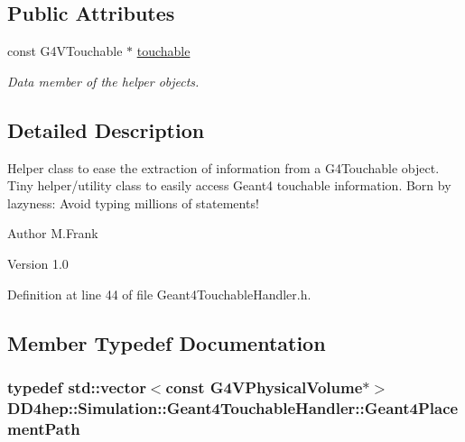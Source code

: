\subsection*{Public Attributes}
\begin{DoxyCompactItemize}
\item 
const G4VTouchable $\ast$ \hyperlink{class_d_d4hep_1_1_simulation_1_1_geant4_touchable_handler_a33a2263e30f96abe93ee3be5a189c3b4}{touchable}
\begin{DoxyCompactList}\small\item\em Data member of the helper objects. \item\end{DoxyCompactList}\end{DoxyCompactItemize}


\subsection{Detailed Description}
Helper class to ease the extraction of information from a G4Touchable object. Tiny helper/utility class to easily access Geant4 touchable information. Born by lazyness: Avoid typing millions of statements!

\begin{DoxyAuthor}{Author}
M.Frank 
\end{DoxyAuthor}
\begin{DoxyVersion}{Version}
1.0 
\end{DoxyVersion}


Definition at line 44 of file Geant4TouchableHandler.h.

\subsection{Member Typedef Documentation}
\hypertarget{class_d_d4hep_1_1_simulation_1_1_geant4_touchable_handler_a3ba887af055edecb3e6cfb04f2c7dc2c}{
\subsubsection[{Geant4PlacementPath}]{\setlength{\rightskip}{0pt plus 5cm}typedef std::vector$<$const G4VPhysicalVolume$\ast$$>$ {\bf DD4hep::Simulation::Geant4TouchableHandler::Geant4PlacementPath}}}
\label{class_d_d4hep_1_1_simulation_1_1_geant4_touchable_handler_a3ba887af055edecb3e6cfb04f2c7dc2c}


